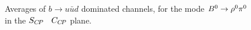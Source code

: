 \begin{figure}[htbp]
  \begin{center}
  \end{center}
  \vspace{-0.8cm}
  \caption{
    Averages of $b \to u\bar u d$ dominated channels,
    for the mode $B^0 \to \rho^0\pi^0$
    in the $S_{C\!P}$ \vs\ $C_{C\!P}$ plane.
  }
  \label{fig:cp_uta:uud:rho0pi0_SvsC}
\end{figure}

